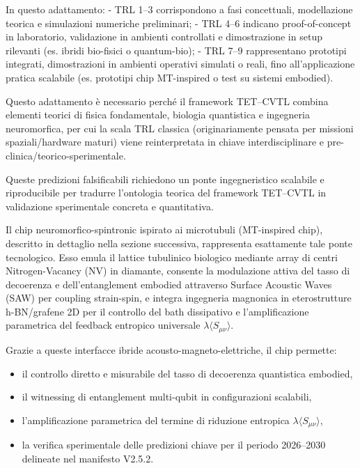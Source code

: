 \documentclass[12pt,a4paper]{article}
\begin{document}
\begin{table}[htbp]
{In questo adattamento:  
- TRL 1–3 corrispondono a fasi concettuali, modellazione teorica e simulazioni numeriche preliminari;  
- TRL 4–6 indicano proof-of-concept in laboratorio, validazione in ambienti controllati e dimostrazione in setup rilevanti (es. ibridi bio-fisici o quantum-bio);  
- TRL 7–9 rappresentano prototipi integrati, dimostrazioni in ambienti operativi simulati o reali, fino all'applicazione pratica scalabile (es. prototipi chip MT-inspired o test su sistemi embodied).  

Questo adattamento è necessario perché il framework TET--CVTL combina elementi teorici di fisica fondamentale, biologia quantistica e ingegneria neuromorfica, per cui la scala TRL classica (originariamente pensata per missioni spaziali/hardware maturi) viene reinterpretata in chiave interdisciplinare e pre-clinica/teorico-sperimentale.
}
\end{table}

\vspace{4pt}



Queste predizioni falsificabili richiedono un ponte ingegneristico scalabile e riproducibile per tradurre l'ontologia teorica del framework TET--CVTL in validazione sperimentale concreta e quantitativa. 

Il chip neuromorfico-spintronic ispirato ai microtubuli (MT-inspired chip), descritto in dettaglio nella sezione successiva, rappresenta esattamente tale ponte tecnologico. Esso emula il lattice tubulinico biologico mediante array di centri Nitrogen-Vacancy (NV) in diamante, consente la modulazione attiva del tasso di decoerenza e dell'entanglement embodied attraverso Surface Acoustic Waves (SAW) per coupling strain-spin, e integra ingegneria magnonica in eterostrutture h-BN/grafene 2D per il controllo del bath dissipativo e l'amplificazione parametrica del feedback entropico universale $\lambda \langle S_{\mu\nu} \rangle$.

Grazie a queste interfacce ibride acousto-magneto-elettriche, il chip permette:
\begin{itemize}
    \item il controllo diretto e misurabile del tasso di decoerenza quantistica embodied,
    \item il witnessing di entanglement multi-qubit in configurazioni scalabili,
    \item l'amplificazione parametrica del termine di riduzione entropica $\lambda \langle S_{\mu\nu} \rangle$,
    \item la verifica sperimentale delle predizioni chiave per il periodo 2026--2030 delineate nel manifesto V2.5.2.
\end{itemize}
\end{document}
